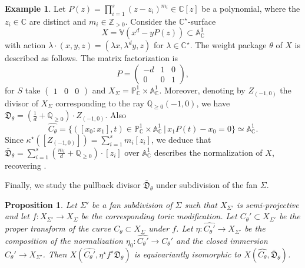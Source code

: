 \documentclass[11pt, reqno]{amsart}
\theoremstyle{plain}
\newtheorem{proposition}[theorem]{Proposition}
\theoremstyle{definition}
\newtheorem{example}[theorem]{Example}
\theoremstyle{remark}
\begin{document}
\begin{example}
Let 
$P(z) =  \prod_{i =1}^{s} (z-z_{i})^{m_{i}}\in \mathbb{C}[z]$
be a polynomial, where the $z_{i}\in\mathbb{C}$ are distinct and $m_{i}\in \mathbb{Z}_{>0}$. Consider the $\mathbb{C}^{\star}$-surface 
$$X =  \mathbb{V}(x^{d}- yP(z))\subset \mathbb{A}_{\mathbb{C}}^{3}$$
with action 
$\lambda\cdot (x, y, z)  =  (\lambda x , \lambda^{d} y, z)$ for $\lambda\in \mathbb{C}^{\star}.$ The weight package $\theta$ of $X$ 
is described as follows. 
The  matrix factorization is 
$$P=
\begin{pmatrix}
-d & 1 & 0\\
0 & 0 & 1
\end{pmatrix},$$ for $S$ take $\begin{pmatrix}
1 & 0 & 0
\end{pmatrix}$ and $X_{\Sigma} = \mathbb{P}_{\mathbb{C}}^{1}\times \mathbb{A}_{\mathbb{C}}^{1}$. Moreover, denoting
by $Z_{(-1, 0)}$ the divisor of $X_{\Sigma}$ corresponding to the ray $\mathbb{Q}_{\geq 0}(-1,0)$, we have
$\mathfrak{D}_{\theta} =  (\frac{1}{d} + \mathbb{Q}_{\geq 0})\cdot Z_{(-1, 0)}$. Also
$$\widehat{C_{\theta}}  = \{([x_{0}: x_{1}], t)\in \mathbb{P}_{\mathbb{C}}^{1}\times \mathbb{A}_{\mathbb{C}}^{1}\, |\, x_{1} P(t) -x_{0} =  0\}\simeq \mathbb{A}^{1}_{\mathbb{C}}.$$
Since
$\kappa^{\star}([Z_{(-1, 0)}]) =  \sum_{i = 1}^{s}m_{i}[z_{i}]$, we deduce that
$\bar{\mathfrak{D}}_{\theta}  =  \sum_{i = 1}^{s} \left(\frac{m_{i}}{d} +\mathbb{Q}_{\geq 0}\right)\cdot [z_{i}]$ over $\mathbb{A}^{1}_{\mathbb{C}}$
describes the normalization of $X$, recovering \cite[Example 3.10]{FZ03}.
\end{example}
Finally, we study the pullback divisor $\bar{\mathfrak{D}}_{\theta}$ under subdivision of the fan $\Sigma$. 
\begin{proposition}\label{prop-sub-kappa}
Let $\Sigma'$ be a fan subdivision of $\Sigma$ such that $X_{\Sigma'}$ is semi-projective and let $f: X_{\Sigma'}\rightarrow X_{\Sigma}$ be 
the corresponding toric modification. Let $C_{\theta}'\subset X_{\Sigma'}$ be the proper transform of the curve $C_{\theta}\subset X_{\Sigma}$ under $f$. Let $\eta: \widehat{C_{\theta}'}\rightarrow X_{\Sigma'}$ be the composition of the normalization $\eta_{0}:\widehat{C_{\theta}'}\rightarrow C_{\theta}'$ and
the closed immersion $C_{\theta}'\rightarrow X_{\Sigma'}$. Then $X(\widehat{C_{\theta}'}, \eta^{\star}f^{\star} \mathfrak{D}_{\theta})$ is equivariantly isomorphic to $X(\widehat{C_{\theta}}, \bar{\mathfrak{D}}_{\theta})$.
\end{proposition}
\end{document}
